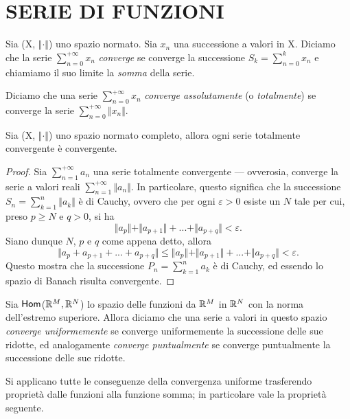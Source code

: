 \documentclass[Completo.tex]{subfiles}
\begin{document}
\section{SERIE DI FUNZIONI}
\begin{Def}
	Sia (X, $\Vert \cdot \Vert$) uno spazio normato. Sia $x_n$ una successione a valori in X. Diciamo che la serie $\sum_{n = 0}^{+\infty} x_n$ \textit{converge} se converge la successione $S_k = \sum_{n=0}^{k} x_n$ e chiamiamo il suo limite la \textit{somma} della serie.
\end{Def}
\begin{Def}
	Diciamo che una serie $\sum_{n = 0}^{+\infty} x_n$  \textit{converge assolutamente} (o \textit{totalmente}) se converge la serie $\sum_{n = 0}^{+\infty} \Vert x_n \Vert$.
\end{Def}
\begin{eTh}
	Sia (X, $\Vert \cdot \Vert$) uno spazio normato completo, allora ogni serie totalmente convergente è convergente.
\end{eTh}
\begin{proof}
	Sia $\sum_{n=1}^{+\infty} a_n$ una serie totalmente convergente --- ovverosia, converge la serie a valori reali $\sum_{n=1}^{+\infty} \Vert a_n \Vert$. In particolare, questo significa che la successione $S_n = \sum_{k=1}^{n} \Vert a_k \Vert$ è di Cauchy, ovvero che per ogni $\varepsilon > 0$ esiste un $N$ tale per cui, preso $p \geq N$ e $q > 0$, si ha
	\begin{equation*}
	\Vert a_p \Vert + \Vert a_{p+1} \Vert + ... + \Vert a_{p+q} \Vert < \varepsilon.
	\end{equation*}
	Siano dunque $N$, $p$ e $q$ come appena detto, allora
	\begin{equation*}
	\Vert a_p + a_{p+1} + ... + a_{p+q} \Vert \leq \Vert a_p \Vert + \Vert a_{p+1} \Vert + ... + \Vert a_{p+q} \Vert < \varepsilon.
	\end{equation*}
	Questo mostra che la successione $P_n = \sum_{k=1}^{n} a_k$ è di Cauchy, ed essendo lo spazio di Banach risulta convergente.
\end{proof}
\begin{Def}
	Sia $\sf[Hom]$($\bb[R]^{M}, \bb[R]^{N}$) lo spazio delle funzioni da $\bb[R]^{M}$ in $\bb[R]^{N}$ con la norma dell'estremo superiore. Allora diciamo che una serie a valori in questo spazio \textit{converge uniformemente} se converge uniformemente la successione delle sue ridotte, ed analogamente \textit{converge puntualmente} se converge puntualmente la successione delle sue ridotte.
\end{Def}
\begin{Oss}
	Si applicano tutte le conseguenze della convergenza uniforme trasferendo proprietà dalle funzioni alla funzione somma; in particolare vale la proprietà seguente.
\end{Oss}
\end{document}
